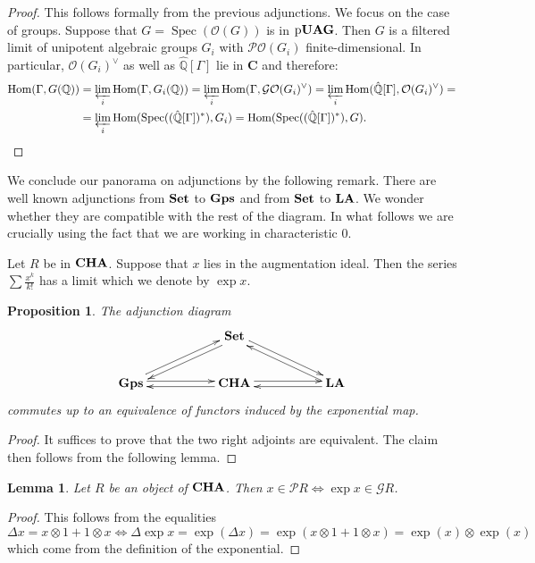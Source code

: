 \documentclass{amsart}
\newtheorem{prop}[thm]{Proposition}
\newtheorem{lemma}[thm]{Lemma}
\theoremstyle{definition}
\theoremstyle{remark}
\theoremstyle{remark}
\newcommand{\Q}{\mathbb{Q}}
\newcommand{\cat}{\mathbf{C}}%
\newcommand{\mcG}{\mathcal{G}}
\newcommand{\mcO}{\mathcal{O}}
\newcommand{\mcP}{\mathcal{P}}
\DeclareMathOperator{\Hom}{Hom}
\DeclareMathOperator{\Spec}{Spec}
\DeclareMathOperator{\CHA}{\bf{CHA}}
\DeclareMathOperator{\Gps}{\bf{Gps}}
\DeclareMathOperator{\LA}{\bf{LA}}
\DeclareMathOperator{\Set}{\bf{Set}}
\DeclareMathOperator{\pUAG}{p\bf{UAG}}
\begin{document}
\begin{proof}
This follows formally from the previous adjunctions. We focus on the case of groups. Suppose that $G=\Spec(\mcO(G))$ is in $\pUAG$. Then $G$ is a filtered limit of unipotent algebraic groups $G_i$ with $\mcP\mcO(G_i)$ finite-dimensional. In particular, $\mcO(G_i)^\vee$ as well as $\hat{\Q}[\Gamma]$ lie in $\cat$ and therefore:
\[
\begin{aligned}
\Hom(\Gamma,G(\Q))&=\varprojlim_i\Hom(\Gamma,G_i(\Q))=\varprojlim_i\Hom(\Gamma,\mcG\mcO(G_i)^\vee)=\varprojlim_i\Hom(\hat{\Q}[\Gamma],\mcO(G_i)^\vee)=\\&=\varprojlim_i\Hom(\Spec((\hat{\Q}[\Gamma])^*),G_i)=\Hom(\Spec((\hat{\Q}[\Gamma])^*),G).
\end{aligned}\]
\end{proof}

We conclude our panorama on adjunctions by the following remark. There are well known adjunctions from $\Set$ to $\Gps$ and from $\Set$ to $\LA$. We wonder whether they are compatible with the rest of the diagram. In what follows we are crucially using the fact that we are working in characteristic $0$.

Let $R$ be in $\CHA$. Suppose that $x$ lies in the augmentation ideal. Then the series $\sum\frac{x^k}{k!}$ has a limit which we denote by $\exp x$. 

\begin{prop}\label{adj}
The adjunction diagram
$$\xymatrix{
&&\Set\ar@<0.5ex>[dll]\ar@<0.5ex>[drr]\\
\Gps\ar@<0.5ex>[urr]\ar@<0.5ex>[rr]&&\CHA\ar@<0.5ex>[rr]\ar@<0.5ex>[ll]&&\LA\ar@<0.5ex>[ull]\ar@<0.5ex>[ll]
}$$
commutes up to an equivalence of functors induced by the exponential map.
\end{prop}

\begin{proof}
It suffices to prove that the two right adjoints are equivalent. The claim then follows from the following lemma.
\end{proof}

\begin{lemma}
Let $R$ be an object of $\CHA$. Then $x\in\mcP R\Leftrightarrow \exp x\in\mcG R$.
\end{lemma}

\begin{proof}
This follows from the equalities
\[
\Delta x=x\otimes1+1\otimes x\Leftrightarrow \Delta\exp x=\exp(\Delta x)=\exp(x\otimes1+1\otimes x)=\exp(x)\otimes\exp(x)
\]
which come from the definition of the exponential.
\end{proof}
\end{document}
